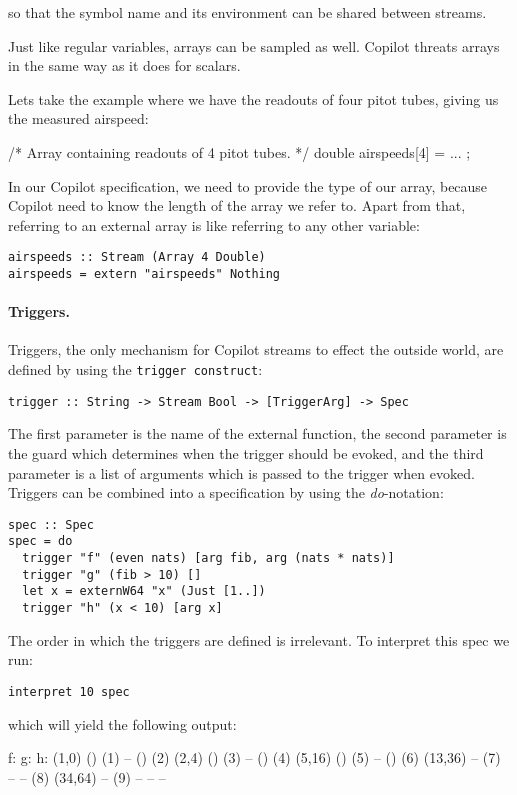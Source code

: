 \noindent
so that the symbol name and its environment can be shared between streams.

Just like regular variables, arrays can be sampled as well. Copilot threats
arrays in the same way as it does for scalars. 
\begin{example}
\label{exmp:pitot}
Lets take the example where we
have the readouts of four pitot tubes, giving us the measured airspeed:
\begin{code}[frame=single]
/* Array containing readouts of 4 pitot tubes. */
double airspeeds[4] = ... ;
\end{code}
In our Copilot specification, we need to provide the type of our array, because
Copilot need to know the length of the array we refer to. Apart from that,
referring to an external array is like referring to any other variable:
\begin{lstlisting}[language=Copilot, frame=single]
airspeeds :: Stream (Array 4 Double)
airspeeds = extern "airspeeds" Nothing
\end{lstlisting}
\end{example}


\paragraph{Triggers.}
Triggers, the only mechanism for Copilot streams to effect the outside world,
are defined by using the {\tt trigger construct}:
%
\begin{lstlisting}[language = Copilot, frame = single]
trigger :: String -> Stream Bool -> [TriggerArg] -> Spec
\end{lstlisting}
%
The first parameter is the name of the external function, the second parameter is the
guard which determines when the trigger should be evoked, and the third parameter
is a list of arguments which is passed to the trigger when evoked.
Triggers can be combined into a specification by using the \emph{do}-notation:
%
\begin{lstlisting}[language = Copilot, frame = single]
spec :: Spec
spec = do
  trigger "f" (even nats) [arg fib, arg (nats * nats)]
  trigger "g" (fib > 10) []
  let x = externW64 "x" (Just [1..])
  trigger "h" (x < 10) [arg x]
\end{lstlisting}
%
The order in which the triggers are defined is irrelevant. To interpret this spec we run:
%
\begin{lstlisting}[language = Copilot, frame = single]
interpret 10 spec
\end{lstlisting}
%
which will yield the following output:
%
\begin{code}
f:        g:	 h:
(1,0)     ()        (1)
--        ()        (2)
(2,4)     ()        (3)
--        ()        (4)
(5,16)    ()        (5)
--        ()        (6)
(13,36)   --	(7)
--        --        (8)
(34,64)   --	(9)
--        --         --
\end{code}
%

